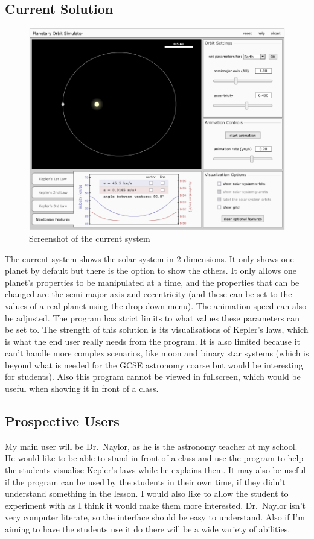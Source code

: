 \subsection{Current Solution}
\begin{figure}[h]
	\includegraphics[width=\textwidth]{./img/existing-solution.png}
	\caption{Screenshot of the current system}
	\label{fig:existing-solution}
\end{figure}
The current system shows the solar system in 2 dimensions. It only shows one
planet by default but there is the option to show the others. It only allows one
planet's properties to be manipulated at a time, and the properties that can be
changed are the semi-major axis and eccentricity (and these can be set to the
values of a real planet using the drop-down menu). The animation speed can also
be adjusted. The program has strict limits to what values these parameters can
be set to. The strength of this solution is its visualisations of Kepler's laws,
which is what the end user really needs from the program. It is also limited
because it can't handle more complex scenarios, like moon and binary star
systems (which is beyond what is needed for the GCSE astronomy coarse but would
be interesting for students). Also this program cannot be viewed in fullscreen,
which would be useful when showing it in front of a class.

\subsection{Prospective Users}
My main user will be Dr.~Naylor, as he is the astronomy teacher at my school. He
would like to be able to stand in front of a class and use the program to help
the students visualise Kepler's laws while he explains them. It may also be
useful if the program can be used by the students in their own time, if they
didn't understand something in the lesson. I would also like to allow the
student to experiment with as I think it would make them more interested.
Dr.~Naylor isn't very computer literate, so the interface should be easy to
understand. Also if I'm aiming to have the students use it do there will be a
wide variety of abilities. 

